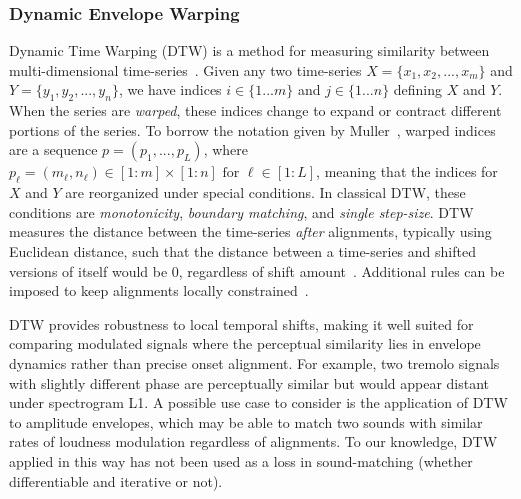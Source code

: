 \subsubsection{Dynamic Envelope Warping}
Dynamic Time Warping (DTW) is a method for measuring similarity between multi-dimensional time-series~\cite{rabiner1993fundamentals,muller2007dynamic,giorgino2009computing}. Given any two time-series $X = \{x_1,x_2,...,x_m\}$ and $Y = \{y_1,y_2,...,y_n\}$, we have indices $i\in\{1...m\}$ and $j\in\{1...n\}$ defining $X$ and $Y$. When the series are \textit{warped}, these indices change to expand or contract different portions of the series. To borrow the notation given by Muller~\cite{muller2007dynamic}, warped indices are a sequence $p=(p_1,...,p_L)$, where \(p_\ell = (m_\ell, n_\ell) \in [1 : m] \times [1 : n] \text{ for } \ell \in [1 : L]\), meaning that the indices for $X$ and $Y$ are reorganized under special conditions. In classical DTW, these conditions are \textit{monotonicity}, \textit{boundary matching}, and \textit{single step-size}. DTW measures the distance between the time-series \textit{after} alignments, typically using Euclidean distance, such that the distance between a time-series and shifted versions of itself would be 0, regardless of shift amount~\cite{tavenard.blog.dtw}. Additional rules can be imposed to keep alignments locally constrained~\cite{itakura1975minimum,sakoe1978dynamic}.

DTW provides robustness to local temporal shifts, making it well suited for comparing modulated signals where the perceptual similarity lies in envelope dynamics rather than precise onset alignment. 
For example, two tremolo signals with slightly different phase are perceptually similar but would appear distant under spectrogram L1. 
A possible use case to consider is the application of DTW to amplitude envelopes, which may be able to match two sounds with similar rates of loudness modulation regardless of alignments. 
To our knowledge, DTW applied in this way has not been used as a loss in sound-matching (whether differentiable and iterative or not).


